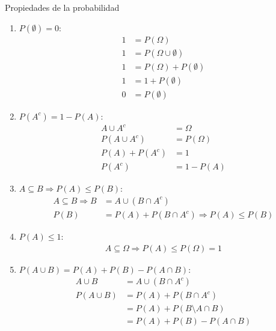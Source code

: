 \begin{demostracion}{Propiedades de la probabilidad}
\begin{enumerate}
    \item $P(\emptyset) = 0$:
        \begin{align*}
            1 &= P(\Omega) \\
            1 &= P(\Omega \cup \emptyset) \\
            1 &= P(\Omega) + P(\emptyset) \\
            1 &= 1 + P(\emptyset) \\
            0 &= P(\emptyset)
        \end{align*}

    \item $P(A^c) = 1 - P(A)$:
        \begin{align*}
            A \cup A^c &= \Omega \\
            P(A \cup A^c) &= P(\Omega) \\
            P(A) + P(A^c) &= 1 \\
            P(A^c) &= 1 - P(A)
        \end{align*}

    \item $A \subseteq B \Rightarrow P(A) \leq P(B)$: \\
        \begin{align*}
            A \subseteq B \Rightarrow B &= A \cup (B \cap A^c) \\
                                   P(B) &= P(A) + P(B \cap A^c) \Rightarrow P(A) \leq P(B)
        \end{align*}

    \item $P(A) \leq 1$: \\
        \begin{align*}
            A \subseteq \Omega \Rightarrow P(A) \leq P(\Omega) = 1
        \end{align*}

    \item $P(A \cup B) = P(A) + P(B) - P(A \cap B)$: \\
        \begin{align*}
            A \cup B &= A \cup (B \cap A^c) \\
            P(A \cup B) &= P(A) + P(B \cap A^c) \\
                        &= P(A) + P(B \setminus A \cap B) \\
                        &= P(A) + P(B) - P(A \cap B)
        \end{align*}
\end{enumerate}
\end{demostracion}

